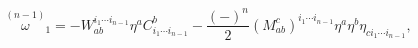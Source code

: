\begin{equation}
\stackrel{(n-1)}{\omega }_{1}=-W_{ab}^{i_{1}\cdots i_{n-1}}\eta
^{a}C_{i_{1}\cdots i_{n-1}}^{b}-\frac{\left( -\right) ^{n}}{2}\left(
M_{ab}^{c}\right) ^{i_{1}\cdots i_{n-1}}\eta ^{a}\eta ^{b}\eta
_{ci_{1}\cdots i_{n-1}},  \label{c14}
\end{equation}

